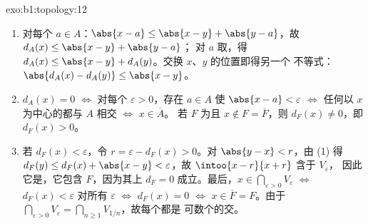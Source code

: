 \begin{solution}{exo:b1:topology:12}
\begin{enumerate}
  \item 对每个 $a \in A$：$\abs{x - a} \leq \abs{x - y} +
        \abs{y - a}$，故 $d_A(x) \leq \abs{x - y} + \abs{y - a}$；
        对 $a$ 取，得 $d_A(x) \leq \abs{x - y} +
        d_A(y)$。交换 $x$、$y$ 的位置即得另一个
        不等式：$\abs{d_A(x) - d_A(y)} \leq \abs{x - y}$。
  \item $d_A(x) = 0$ $\iff$ 对每个 $\varepsilon > 0$，存在
        $a \in A$ 使 $\abs{x - a} < \varepsilon$ $\iff$ 任何以
        $x$ 为中心的都与 $A$ 相交 $\iff$ $x \in \overline A$。
        若 $F$ 为且 $x \notin F = \overline F$，则
        $d_F(x) \neq 0$，即 $d_F(x) > 0$。
  \item 若 $d_F(x) < \varepsilon$，令 $r = \varepsilon -
        d_F(x) > 0$。对 $\abs{y - x} < r$，由 (1) 得
        $d_F(y) \leq d_F(x) + \abs{x - y} < \varepsilon$，故
         $\intoo{x - r}{x + r}$ 含于 $V_\varepsilon$，
        因此它是，它包含 $F$，因为其上 $d_F = 0$
        成立。最后，$x \in \bigcap_{\varepsilon>0}
        V_\varepsilon$ $\iff$ $d_F(x) < \varepsilon$ 对所有
        $\varepsilon$ $\iff$ $d_F(x) = 0$ $\iff$ $x \in \overline
        F = F$。由于 $\bigcap_{\varepsilon > 0} V_\varepsilon =
        \bigcap_{n \geq 1} V_{1/n}$，故每个都是
        可数个的交。
\end{enumerate}
\end{solution}

